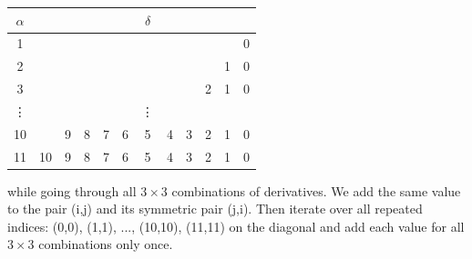    \begin{longtable}{c|ccccccccccc}
      $\alpha$ & \hspace{6mm} & \hspace{6mm} & \hspace{6mm} & \hspace{6mm} & \hspace{6mm} & \hspace{1.3mm} $\delta$ \hspace{1.3mm} & \hspace{6mm} & \hspace{6mm} & \hspace{6mm} & \hspace{6mm} & \hspace{6mm} \\
      \hline
      1  &    &   &   &   &   &   &   &   &   &   & 0 \\
      2  &    &   &   &   &   &   &   &   &   & 1 & 0 \\
      3  &    &   &   &   &   &   &   &   & 2 & 1 & 0 \\
      \vdots&&  &   &   &   &\vdots&   &   &   &   &  \\
      10 &    & 9 & 8 & 7 & 6 & 5 & 4 & 3 & 2 & 1 & 0 \\
      11 & 10 & 9 & 8 & 7 & 6 & 5 & 4 & 3 & 2 & 1 & 0
   \end{longtable}
   
   while going through all $3 \times 3$ combinations of derivatives. We add the same value to the pair (i,j) and its symmetric pair (j,i). Then iterate over all repeated indices: (0,0), (1,1), ..., (10,10), (11,11) on the diagonal and add each value for all $3 \times 3$ combinations only once.

